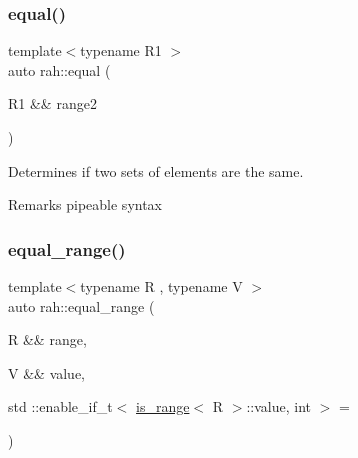 \subsubsection{\texorpdfstring{equal()}{equal()}\hspace{0.1cm}{\footnotesize\ttfamily [2/2]}}
{\footnotesize\ttfamily template$<$typename R1 $>$ \\
auto rah\+::equal (\begin{DoxyParamCaption}\item[{R1 \&\&}]{range2 }\end{DoxyParamCaption})}



Determines if two sets of elements are the same. 

\begin{DoxyRemark}{Remarks}
pipeable syntax
\end{DoxyRemark}

\begin{DoxyCodeInclude}{0}
\end{DoxyCodeInclude}
\mbox{\label{namespacerah_a984a8f5d104b54913aefe80077c2026f}} 
\subsubsection{\texorpdfstring{equal\_range()}{equal\_range()}\hspace{0.1cm}{\footnotesize\ttfamily [1/4]}}
{\footnotesize\ttfamily template$<$typename R , typename V $>$ \\
auto rah\+::equal\+\_\+range (\begin{DoxyParamCaption}\item[{R \&\&}]{range,  }\item[{V \&\&}]{value,  }\item[{std \+::enable\+\_\+if\+\_\+t$<$ \mbox{\hyperlink{structrah_1_1is__range}{is\+\_\+range}}$<$ R $>$\+::value, int $>$}]{ = {} }\end{DoxyParamCaption})}



